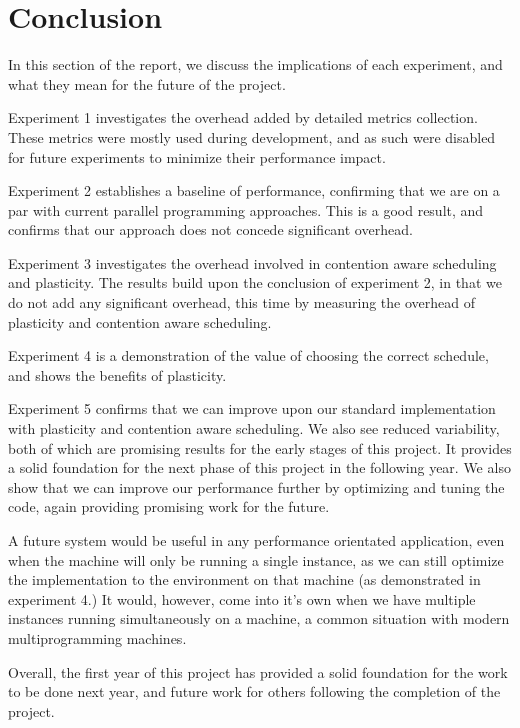 



\section{Conclusion}

In this section of the report, we discuss the implications of each experiment, and what they mean for the future of the project. 

Experiment 1 investigates the overhead added by detailed metrics collection. These metrics were mostly used during development, and as such were disabled for future experiments to minimize their performance impact. 

Experiment 2 establishes a baseline of performance, confirming that we are on a par with current parallel programming approaches. This is a good result, and confirms that our approach does not concede significant overhead. 

Experiment 3 investigates the overhead involved in contention aware scheduling and plasticity. The results build upon the conclusion of experiment 2, in that we do not add any significant overhead, this time by measuring the overhead of plasticity and contention aware scheduling.

Experiment 4 is a demonstration of the value of choosing the correct schedule, and shows the benefits of plasticity. 

Experiment 5 confirms that we can improve upon our standard implementation with plasticity and contention aware scheduling. We also see reduced variability, both of which are promising results for the early stages of this project. It provides a solid foundation for the next phase of this project in the following year. We also show that we can improve our performance further by optimizing and tuning the code, again providing promising work for the future.

A future system would be useful in any performance orientated application, even when the machine will only be running a single instance, as we can still optimize the implementation to the environment on that machine (as demonstrated in experiment 4.) It would, however, come into it's own when we have multiple instances running simultaneously on a machine, a common situation with modern multiprogramming machines.

Overall, the first year of this project has provided a solid foundation for the work to be done next year, and future work for others following the completion of the project.